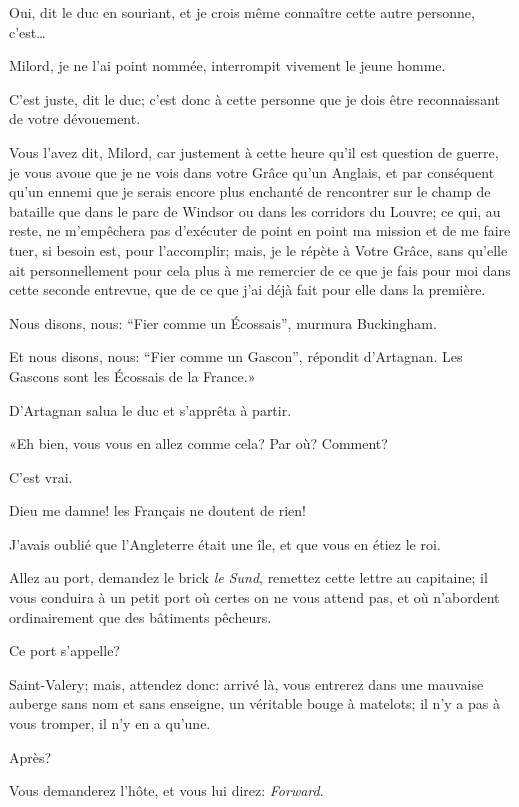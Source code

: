 \speak  Oui, dit le duc en souriant, et je crois même connaître cette autre personne, c'est\dots 

\speak  Milord, je ne l'ai point nommée, interrompit vivement le jeune homme. 

\speak  C'est juste, dit le duc; c'est donc à cette personne que je dois être reconnaissant de votre dévouement. 

\speak  Vous l'avez dit, Milord, car justement à cette heure qu'il est question de guerre, je vous avoue que je ne vois dans votre Grâce qu'un Anglais, et par conséquent qu'un ennemi que je serais encore plus enchanté de rencontrer sur le champ de bataille que dans le parc de Windsor ou dans les corridors du Louvre; ce qui, au reste, ne m'empêchera pas d'exécuter de point en point ma mission et de me faire tuer, si besoin est, pour l'accomplir; mais, je le répète à Votre Grâce, sans qu'elle ait personnellement pour cela plus à me remercier de ce que je fais pour moi dans cette seconde entrevue, que de ce que j'ai déjà fait pour elle dans la première. 

\speak  Nous disons, nous: “Fier comme un Écossais”, murmura Buckingham. 

\speak  Et nous disons, nous: “Fier comme un Gascon”, répondit d'Artagnan. Les Gascons sont les Écossais de la France.» 

D'Artagnan salua le duc et s'apprêta à partir. 

«Eh bien, vous vous en allez comme cela? Par où? Comment? 

\speak  C'est vrai. 

\speak  Dieu me damne! les Français ne doutent de rien! 

\speak  J'avais oublié que l'Angleterre était une île, et que vous en étiez le roi. 

\speak  Allez au port, demandez le brick \textit{le Sund}, remettez cette lettre au capitaine; il vous conduira à un petit port où certes on ne vous attend pas, et où n'abordent ordinairement que des bâtiments pêcheurs. 

\speak  Ce port s'appelle? 

\speak  Saint-Valery; mais, attendez donc: arrivé là, vous entrerez dans une mauvaise auberge sans nom et sans enseigne, un véritable bouge à matelots; il n'y a pas à vous tromper, il n'y en a qu'une. 

\speak  Après? 

\speak  Vous demanderez l'hôte, et vous lui direz: \textit{Forward}. 

